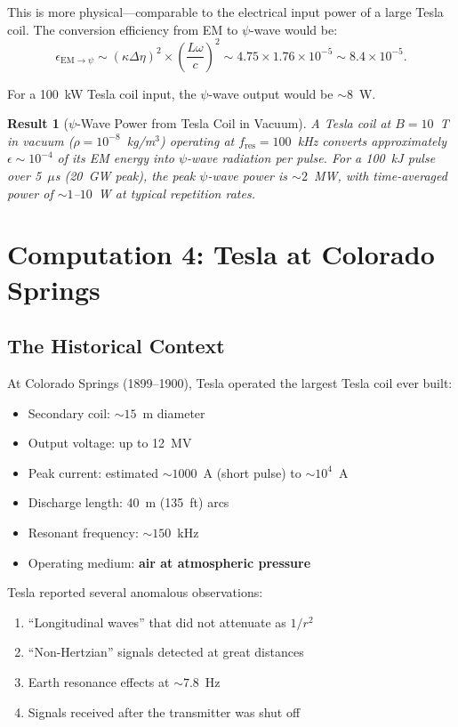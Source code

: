 \documentclass[11pt,a4paper]{article}
\newtheorem{result}{Result}
\begin{document}
This is more physical---comparable to the electrical input power of a large Tesla coil.
The conversion efficiency from EM to $\psi$-wave would be:
\begin{equation}
\epsilon_{\mathrm{EM}\to\psi} \sim (\kappa\Delta\eta)^2 \times \left(\frac{L\omega}{c}\right)^2
\sim 4.75 \times 1.76 \times 10^{-5} \sim 8.4 \times 10^{-5}.
\end{equation}

For a 100~kW Tesla coil input, the $\psi$-wave output would be $\sim 8$~W.

\begin{result}[$\psi$-Wave Power from Tesla Coil in Vacuum]
A Tesla coil at $B = 10$~T in vacuum ($\rho = 10^{-8}$~kg/m$^3$) operating at
$f_{\mathrm{res}} = 100$~kHz converts approximately $\epsilon \sim 10^{-4}$ of its
EM energy into $\psi$-wave radiation per pulse. For a 100~kJ pulse over 5~$\mu$s
(20~GW peak), the peak $\psi$-wave power is $\sim 2$~MW, with time-averaged
power of $\sim 1$--$10$~W at typical repetition rates.
\end{result}

\section{Computation 4: Tesla at Colorado Springs}\label{sec:colorado}

\subsection{The Historical Context}

At Colorado Springs (1899--1900), Tesla operated the largest Tesla coil ever built:
\begin{itemize}
\item Secondary coil: $\sim 15$~m diameter
\item Output voltage: up to 12~MV
\item Peak current: estimated $\sim 1000$~A (short pulse) to $\sim 10^4$~A
\item Discharge length: 40~m (135~ft) arcs
\item Resonant frequency: $\sim 150$~kHz
\item Operating medium: \textbf{air at atmospheric pressure}
\end{itemize}

Tesla reported several anomalous observations:
\begin{enumerate}
\item ``Longitudinal waves'' that did not attenuate as $1/r^2$
\item ``Non-Hertzian'' signals detected at great distances
\item Earth resonance effects at $\sim 7.8$~Hz
\item Signals received after the transmitter was shut off
\end{enumerate}
\end{document}
